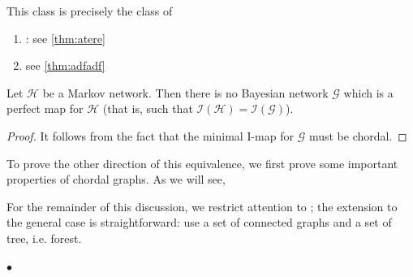\documentclass{article}
\begin{document}
 This class is precisely the class of 

\begin{enumerate}
    \item {}: see \cref{thm:atere}
    \item {} see \cref{thm:adfadf}
\end{enumerate}


\begin{thma}\label{thm:atere}
Let $\mathcal{H}$ be a  Markov network. Then there is no Bayesian network $\mathcal{G}$ which is a perfect map for $\mathcal{H}$ (that is, such that $\mathcal{I}(\mathcal{H})=\mathcal{I}(\mathcal{G})$).
\end{thma}
\begin{proof}
It follows from the fact that the minimal I-map for $\mathcal{G}$ must be chordal.
\end{proof}


To prove the other direction of this equivalence, we first prove some important properties of chordal graphs. As we will see,  

For the remainder of this discussion, we restrict attention to ; the extension to the general case is straightforward: use a set of connected graphs and a set of  tree, i.e. forest.


$\bullet$ 
\end{document}

